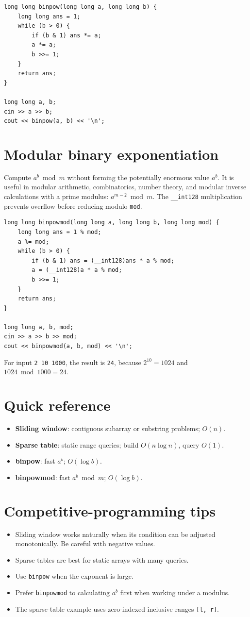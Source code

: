 \begin{lstlisting}
long long binpow(long long a, long long b) {
    long long ans = 1;
    while (b > 0) {
        if (b & 1) ans *= a;
        a *= a;
        b >>= 1;
    }
    return ans;
}

long long a, b;
cin >> a >> b;
cout << binpow(a, b) << '\n';
\end{lstlisting}

\section{Modular binary exponentiation}

Compute $a^b \bmod m$ without forming the potentially enormous value $a^b$. It is useful in modular arithmetic, combinatorics, number theory, and modular inverse calculations with a prime modulus: $a^{m-2} \bmod m$. The \texttt{\_\_int128} multiplication prevents overflow before reducing modulo \texttt{mod}.

\begin{lstlisting}
long long binpowmod(long long a, long long b, long long mod) {
    long long ans = 1 % mod;
    a %= mod;
    while (b > 0) {
        if (b & 1) ans = (__int128)ans * a % mod;
        a = (__int128)a * a % mod;
        b >>= 1;
    }
    return ans;
}

long long a, b, mod;
cin >> a >> b >> mod;
cout << binpowmod(a, b, mod) << '\n';
\end{lstlisting}

For input \texttt{2 10 1000}, the result is \texttt{24}, because $2^{10} = 1024$ and $1024 \bmod 1000 = 24$.

\section{Quick reference}
\begin{itemize}
\item \textbf{Sliding window}: contiguous subarray or substring problems; $O(n)$.
\item \textbf{Sparse table}: static range queries; build $O(n \log n)$, query $O(1)$.
\item \textbf{binpow}: fast $a^b$; $O(\log b)$.
\item \textbf{binpowmod}: fast $a^b \bmod m$; $O(\log b)$.
\end{itemize}

\section{Competitive-programming tips}
\begin{itemize}
\item Sliding window works naturally when its condition can be adjusted monotonically. Be careful with negative values.
\item Sparse tables are best for static arrays with many queries.
\item Use \texttt{binpow} when the exponent is large.
\item Prefer \texttt{binpowmod} to calculating $a^b$ first when working under a modulus.
\item The sparse-table example uses zero-indexed inclusive ranges \texttt{[l, r]}.
\end{itemize}
